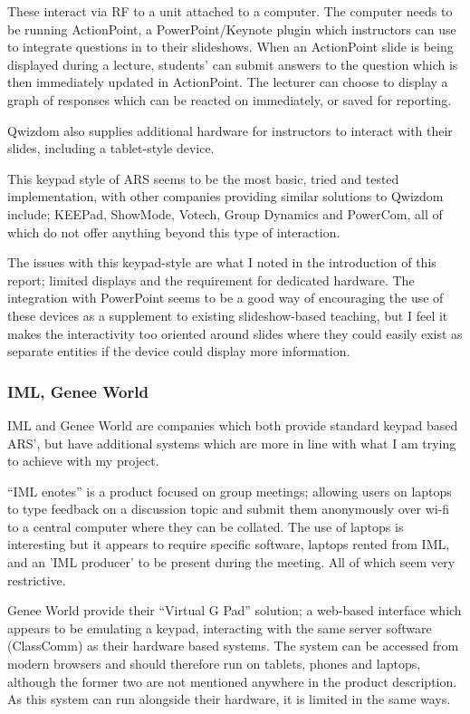 \documentclass[a4papert,11pt,notitlepage]{ltxdoc}
\begin{document}
These interact via RF to a unit attached to a computer. The computer needs to be running ActionPoint, a PowerPoint/Keynote plugin which instructors can use to integrate questions in to their slideshows. When an ActionPoint slide is being displayed during a lecture, students' can submit answers to the question which is then immediately updated in ActionPoint. The lecturer can choose to display a graph of responses which can be reacted on immediately, or saved for reporting.

Qwizdom also supplies additional hardware for instructors to interact with their slides, including a tablet-style device.

This keypad style of ARS seems to be the most basic, tried and tested implementation, with other companies providing similar solutions to Qwizdom include; KEEPad, ShowMode, Votech, Group Dynamics and PowerCom, all of which do not offer anything beyond this type of interaction.

The issues with this keypad-style are what I noted in the introduction of this report; limited displays and the requirement for dedicated hardware. The integration with PowerPoint seems to be a good way of encouraging the use of these devices as a supplement to existing slideshow-based teaching, but I feel it makes the interactivity too oriented around slides where they could easily exist as separate entities if the device could display more information.

\subsubsection{IML, Genee World}
IML and Genee World are companies which both provide standard keypad based ARS', but have additional systems which are more in line with what I am trying to achieve with my project.

``IML enotes'' is a product focused on group meetings; allowing users on laptops to type feedback on a discussion topic and submit them anonymously over wi-fi to a central computer where they can be collated. The use of laptops is interesting but it appears to require specific software, laptops rented from IML, and an 'IML producer' to be present during the meeting. All of which seem very restrictive.

Genee World provide their ``Virtual G Pad'' solution; a web-based interface which appears to be emulating a keypad, interacting with the same server software (ClassComm) as their hardware based systems. The system can be accessed from modern browsers and should therefore run on tablets, phones and laptops, although the former two are not mentioned anywhere in the product description. As this system can run alongside their hardware, it is limited in the same ways.
\end{document}

